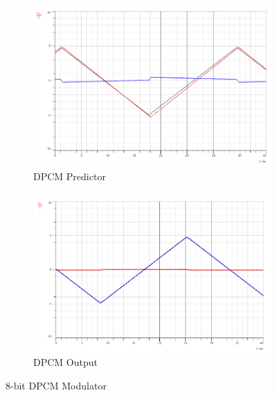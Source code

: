 \documentclass[12pt]{article}
\begin{document}
\begin{figure}[H]
    \begin{subfigure}[b]{0.49\textwidth}
        \centering
        \includegraphics[width=\textwidth]{assets/main/2023-08-26-22-58-44.png}
        \caption{DPCM Predictor}
    \end{subfigure}
    \begin{subfigure}[b]{0.49\textwidth}
        \centering
        \includegraphics[width=\textwidth]{assets/main/2023-08-26-23-04-49.png}
        \caption{DPCM Output}
    \end{subfigure}
    \caption{8-bit DPCM Modulator}
\end{figure}
\end{document}

